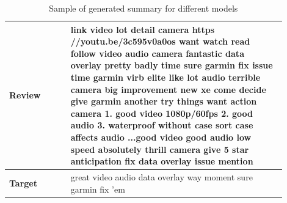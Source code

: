 \documentclass{article}
\begin{document}
\begin{appendices}
\begin{table}[H]
\caption{Sample of generated summary for different models}
\renewcommand{\arraystretch}{1.5}
	\centering
	\begin{tabular}{|p{0.2\linewidth} | p{0.7\linewidth}|}
		\hline
		\multirow{2}{4em}{\textbf{Review}} & link video lot detail camera https //youtu.be/3c595v0a0os want watch read follow video audio camera fantastic data overlay pretty badly time sure garmin fix issue time garmin virb elite like lot audio terrible camera big improvement new xe come decide give garmin another try things want action camera 1. good video 1080p/60fps 2. good audio 3. waterproof without case sort case affects audio ...good video good audio low speed absolutely thrill camera give 5 star anticipation fix data overlay issue mention\\ 
		\hline
		\multirow{1}{4em}{\textbf{Target}} & great video audio data overlay way moment sure garmin fix 'em\\
		\hline
	\end{tabular}
\end{table}


\end{appendices}
\end{document}

